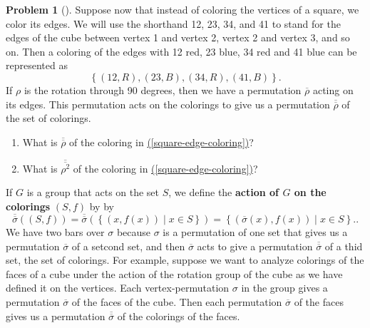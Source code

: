 \documentclass[10pt,]{book}
\newcommand{\terminology}[1]{\textbf{#1}}
\theoremstyle{plain}
\theoremstyle{definition}
\newtheorem{activity}[project]{Problem}
\theoremstyle{definition}
\numberwithin{equation}{chapter}
\begin{document}
\begin{activity}[]\marginsymbol[-1em]{} \label{activity-284}
Suppose now that instead of coloring the vertices of a square, we color its edges. We will use the shorthand 12, 23, 34, and 41 to stand for the edges of the cube between vertex 1 and vertex 2, vertex 2 and vertex 3, and so on. Then a coloring of the edges with 12 red, 23 blue, 34 red and 41 blue can be represented as%
\begin{equation}
\left\{(12,R),(23,B),(34,R),(41,B)\right\}\text{.}\label{square-edge-coloring}
\end{equation}
If \(\rho\) is the rotation through 90 degrees, then we have a permutation \(\overline{\rho}\) acting on its edges. This permutation acts on the colorings to give us a permutation \(\overline{\overline{\rho}}\) of the set of colorings.%
\begin{enumerate}[font=\bfseries,label=(\alph*),ref=\alph*]
\item\label{task-212} \marginsymbol[-2.5em]{} What is \(\overline{\overline{\rho}}\) of the coloring in \hyperref[square-edge-coloring]{(\ref{square-edge-coloring})}?%
\item\label{task-213} \marginsymbol[-2.5em]{} What is \(\overline{\overline{\rho^2}}\) of the coloring in \hyperref[square-edge-coloring]{(\ref{square-edge-coloring})}?%
\end{enumerate}
\end{activity}
If \(G\) is a group that acts on the set \(S\), we define the \terminology{action of \(G\) on the colorings} \((S,f)\) by by%
\begin{equation}
\overline{\overline{\sigma}}((S,f))=\overline{\overline{\sigma}}\left(\left\{(x,f(x))\mid x\in S\right\}\right) = \left\{\left(\overline{\sigma}(x),f(x)\right)\mid x\in S\right\}.\text{.}\label{action-on-colorings}
\end{equation}
We have two bars over \(\sigma\) because \(\sigma\) is a permutation of one set that gives us a permutation \(\overline{\sigma}\) of a setcond set, and then \(\overline{\sigma}\) acts to give a permutation \(\overline{\overline{\sigma}}\) of a thid set, the set of colorings. For example, suppose we want to analyze colorings of the faces of a cube under the action of the rotation group of the cube as we have defined it on the vertices. Each vertex-permutation \(\sigma\) in the group gives a permutation \(\overline{\sigma}\) of the faces of the cube. Then each permutation \(\overline{\sigma}\) of the faces gives us a permutation \(\overline{\overline{\sigma}}\) of the colorings of the faces.%
\end{document}
